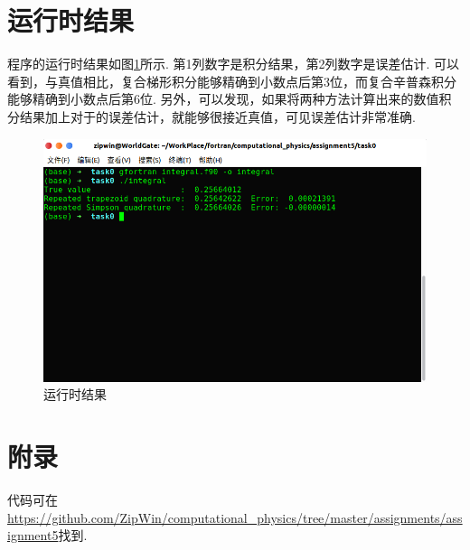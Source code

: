 \documentclass{article}
\begin{document}
	\section{运行时结果}
	程序的运行时结果如图\ref{fig:rtr}所示. 第1列数字是积分结果，第2列数字是误差估计. 可以看到，与真值相比，复合梯形积分能够精确到小数点后第3位，而复合辛普森积分能够精确到小数点后第6位. 另外，可以发现，如果将两种方法计算出来的数值积分结果加上对于的误差估计，就能够很接近真值，可见误差估计非常准确.
	\begin{figure}[h!tb]
		\centering
		\includegraphics[width=1.0\textwidth]{./utils/rtr.png}
		\caption{ 运行时结果\label{fig:rtr}}
	\end{figure}
    	
	\section*{附录}
	代码可在\url{https://github.com/ZipWin/computational_physics/tree/master/assignments/assignment5}找到.
	
	
\end{document}
